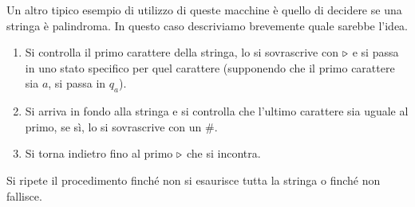 Un altro tipico esempio di utilizzo di queste macchine è
quello di decidere se una stringa è palindroma. In questo
caso descriviamo brevemente quale sarebbe l'idea.
\begin{enumerate}
	\item Si controlla il primo carattere della stringa, lo si
	      sovrascrive con $\triangleright$ e si passa in uno stato
	      specifico per quel carattere (supponendo che il primo
	      carattere sia $a$, si passa in $q_a$).
	\item Si arriva in fondo alla stringa e si controlla che
	      l'ultimo carattere sia uguale al primo, se sì, lo
	      si sovrascrive con un $\#$.
	\item Si torna indietro fino al primo $\triangleright$ che si
	      incontra.
\end{enumerate}
Si ripete il procedimento finché non si esaurisce tutta la
stringa o finché non fallisce.

